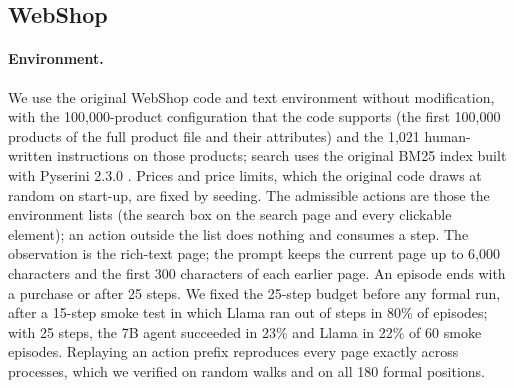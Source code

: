 \documentclass{article}
\theoremstyle{plain}
\theoremstyle{definition}
\theoremstyle{remark}
\begin{document}
\subsection{WebShop}
\label{app:webshop}

\paragraph{Environment.}
We use the original WebShop code and text environment \citep{yao2022webshop} without modification, with the 100,000-product configuration that the code supports (the first 100,000 products of the full product file and their attributes) and the 1,021 human-written instructions on those products; search uses the original BM25 index built with Pyserini 2.3.0 \citep{lin2021pyserini}. Prices and price limits, which the original code draws at random on start-up, are fixed by seeding. The admissible actions are those the environment lists (the search box on the search page and every clickable element); an action outside the list does nothing and consumes a step. The observation is the rich-text page; the prompt keeps the current page up to 6,000 characters and the first 300 characters of each earlier page. An episode ends with a purchase or after 25 steps. We fixed the 25-step budget before any formal run, after a 15-step smoke test in which Llama ran out of steps in 80\% of episodes; with 25 steps, the 7B agent succeeded in 23\% and Llama in 22\% of 60 smoke episodes. Replaying an action prefix reproduces every page exactly across processes, which we verified on random walks and on all 180 formal positions.
\end{document}
